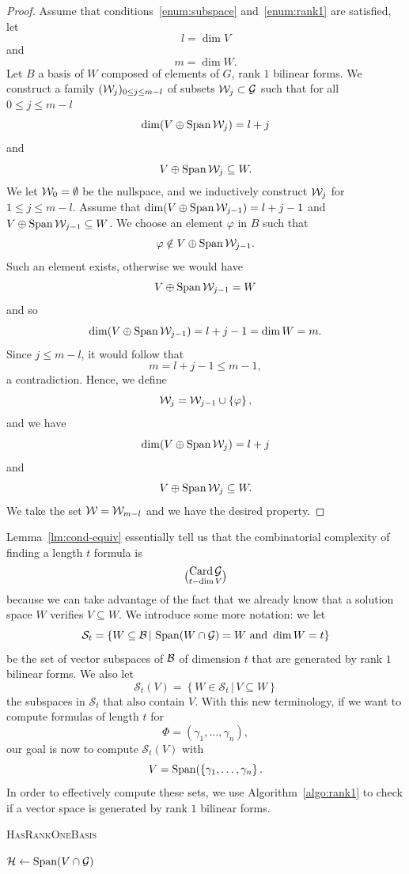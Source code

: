 \begin{proof}
  Assume that conditions~\ref{enum:subspace} and~\ref{enum:rank1} are satisfied,
  let
  \[
    l = \dim V
  \]
  and
  \[
    m = \dim W.
  \]
  Let $B$ a basis of $W$ composed of elements of $G$, \ie rank $1$ bilinear
  forms. We construct a family $(\mathcal{W}_j)_{0\leq j\leq m-l}$ of subsets
  $\mathcal{W}_j\subset\mathcal{G}$ such that for all
  $0\leq j\leq m-l$
  \[
    \dim(V\oplus\operatorname{Span}\mathcal{W}_j) = l+j
  \]
  and
  \[
    V\oplus\operatorname{Span}\mathcal{W}_j \subseteq W.
  \]
  We let $\mathcal{W}_0=\emptyset$ be the nullspace, and we inductively construct $\mathcal{W}_j$
  for $1\leq j\leq m-l$. Assume that  $\dim(V\oplus\operatorname{Span}\mathcal{W}_{j-1}) = l+j-1$ and
  $V\oplus\operatorname{Span}\mathcal{W}_{j-1} \subseteq W$. We choose an element $\varphi$ in $B$ such
  that
  \[
    \varphi\notin V\oplus\operatorname{Span}\mathcal{W}_{j-1}.
  \]
  Such an element exists, otherwise we would have
  \[
    V\oplus\operatorname{Span}\mathcal{W}_{j-1}=W
  \]
  and so 
  \[
    \dim(V\oplus\operatorname{Span}\mathcal{W}_{j-1}) = l+j-1=\dim W = m.
  \]
  Since $j\leq m-l$, it would follow that
  \[
    m = l+j-1\leq m-1,
  \]
  a contradiction. Hence, we define 
  \[
    \mathcal{W}_j = \mathcal{W}_{j-1}\cup\left\{ \varphi \right\},
  \]
  and we have
  \[
    \dim(V\oplus\operatorname{Span}\mathcal{W}_j) = l+j
  \]
  and
  \[
    V\oplus\operatorname{Span}\mathcal{W}_j \subseteq W.
  \]
  We take the set $\mathcal{W} = \mathcal{W}_{m-l}$ and we have the desired property.
\end{proof}
Lemma~\ref{lm:cond-equiv} essentially tell us that the combinatorial complexity
of finding a length $t$ formula is
\[
  {\operatorname{Card}\mathcal{G}}\choose{t - \dim V}
\]
because we can take advantage of the fact that we already know that a solution
space $W$ verifies $V\subseteq W$. We introduce some more notation: we let
\[
  \mathcal S_t=\left\{ W\subseteq\mathcal{B}\,|\,\operatorname{Span}(W\cap\mathcal{G})=W\text{ and } \dim W = t\right\}
\]
be the set of vector subspaces of $\mathcal{B}$ of dimension $t$ that are generated by
rank $1$ bilinear forms. We also let
\[
  \mathcal S_t(V)=\left\{ W\in\mathcal S_t\,|\,V\subseteq W \right\}
\]
the subspaces in $\mathcal S_t$ that also contain $V$. With this new
terminology, if we want to compute formulas of length $t$ for
\[
  \Phi = (\gamma_1, \dots, \gamma_n),
\]
our goal is now to compute $\mathcal S_t(V)$ with
\[
  V = \operatorname{Span}(\left\{ \gamma_1, \dots, \gamma_n \right\}.
\]
In order to effectively compute these sets, we use Algorithm~\ref{algo:rank1} to
check if a vector space is generated by rank $1$ bilinear forms.
\begin{algorithm}
  \caption{\textsc{HasRankOneBasis}}
  \label{algo:rank1}
  \begin{algorithmic}[1]
    \State $\mathcal H\gets \operatorname{Span}(V\cap\mathcal{G})$
    \State \Return{\True}
    \Else
    \State \Return{\False}
    \EndIf
  \end{algorithmic}
\end{algorithm}
